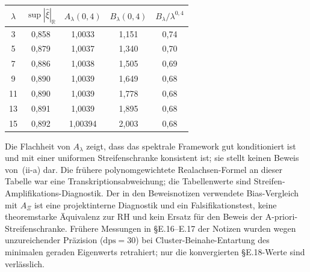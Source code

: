 \documentclass[11pt,a4paper]{article}
\theoremstyle{remark}
\theoremstyle{plain}
\begin{document}
\begin{center}
\footnotesize
\renewcommand{\arraystretch}{1.15}
\begin{tabular}{c|c|c|c|c}
$\lambda$ & $\sup|\hat\xi|_{\mathbb{R}}$ & $A_\lambda(0{,}4)$ & $B_\lambda(0{,}4)$ & $B_\lambda/\lambda^{0{,}4}$ \\\hline
 3 & 0{,}858 & 1{,}0033 & 1{,}151 & 0{,}74 \\
 5 & 0{,}879 & 1{,}0037 & 1{,}340 & 0{,}70 \\
 7 & 0{,}886 & 1{,}0038 & 1{,}505 & 0{,}69 \\
 9 & 0{,}890 & 1{,}0039 & 1{,}649 & 0{,}68 \\
11 & 0{,}890 & 1{,}0039 & 1{,}778 & 0{,}68 \\
13 & 0{,}891 & 1{,}0039 & 1{,}895 & 0{,}68 \\
15 & 0{,}892 & 1{,}00394 & 2{,}003 & 0{,}68
\end{tabular}
\end{center}

Die Flachheit von $A_\lambda$ zeigt, dass das spektrale Framework gut
konditioniert ist und mit einer uniformen Streifenschranke konsistent ist;
sie stellt keinen Beweis von~(ii-a) dar. Die frühere polynomgewichtete
Realachsen-Formel an dieser Tabelle war eine Transkriptionsabweichung; die
Tabellenwerte sind Streifen-Amplifikations-Diagnostik. Der in den
Beweisnotizen verwendete Bias-Vergleich mit $A_\Xi$ ist eine
projektinterne Diagnostik und ein Falsifikationstest, keine theoremstarke
Äquivalenz zur RH und kein Ersatz für den Beweis der A-priori-Streifenschranke.
Frühere Messungen in
§E.16--E.17 der Notizen wurden wegen unzureichender Präzision
($\mathrm{dps}=30$) bei Cluster-Beinahe-Entartung des minimalen geraden
Eigenwerts retrahiert; nur die konvergierten §E.18-Werte sind verlässlich.
\end{document}
